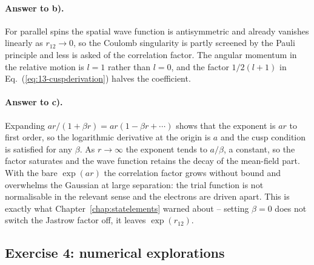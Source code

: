 \paragraph{Answer to b).}
For parallel spins the spatial wave function is antisymmetric and already
vanishes linearly as $r_{12}\to0$, so the Coulomb singularity is partly
screened by the Pauli principle and less is asked of the correlation factor.
The angular momentum in the relative motion is $l=1$ rather than $l=0$, and
the factor $1/2(l+1)$ in Eq.~(\ref{eq:13-cuspderivation}) halves the
coefficient.

\paragraph{Answer to c).}
Expanding $ar/(1+\beta r) = ar(1-\beta r + \cdots)$ shows that the exponent is
$ar$ to first order, so the logarithmic derivative at the origin is $a$ and
the cusp condition is satisfied for any $\beta$.  As $r\to\infty$ the exponent
tends to $a/\beta$, a constant, so the factor saturates and the wave function
retains the decay of the mean-field part.  With the bare $\exp(ar)$ the
correlation factor grows without bound and overwhelms the Gaussian at large
separation: the trial function is not normalisable in the relevant sense and
the electrons are driven apart.  This is exactly what
Chapter~\ref{chap:statelements} warned about -- setting $\beta=0$ does not
switch the Jastrow factor off, it leaves $\exp(r_{12})$.

\subsection*{Exercise 4: numerical explorations}

